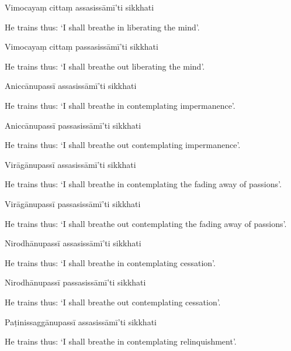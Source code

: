 Vimocayaṃ cittaṃ assasissāmī'ti sikkhati

\begin{english}
  He trains thus: `I shall breathe in liberating the mind'.
\end{english}

Vimocayaṃ cittaṃ passasissāmī'ti sikkhati

\begin{english}
  He trains thus: `I shall breathe out liberating the mind'.
\end{english}

Aniccānupassī assasissāmī'ti sikkhati

\begin{english}
  He trains thus: `I shall breathe in contemplating impermanence'.
\end{english}

Aniccānupassī passasissāmī'ti sikkhati

\begin{english}
  He trains thus: `I shall breathe out contemplating impermanence'.
\end{english}

Virāgānupassī assasissāmī'ti sikkhati

\begin{english}
  He trains thus: `I shall breathe in contemplating the fading away of passions'.
\end{english}

Virāgānupassī passasissāmī'ti sikkhati

\begin{english}
  He trains thus: `I shall breathe out contemplating the fading away of passions'.
\end{english}

Nirodhānupassī assasissāmī'ti sikkhati

\begin{english}
  He trains thus: `I shall breathe in contemplating cessation'.
\end{english}

Nirodhānupassī passasissāmī'ti sikkhati

\begin{english}
  He trains thus: `I shall breathe out contemplating cessation'.
\end{english}

Paṭinissaggānupassī assasissāmī'ti sikkhati

\begin{english}
  He trains thus: `I shall breathe in contemplating relinquishment'.
\end{english}

